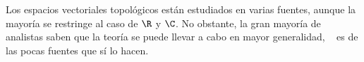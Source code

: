 \documentclass[topologia-analisis.tex]{subfiles}
\begin{document}
Los espacios vectoriales topológicos están estudiados en varias fuentes, aunque la mayoría se restringe al caso de $\R$ y $\C$.
No obstante, la gran mayoría de analistas saben que la teoría se puede llevar a cabo en mayor generalidad,
\citeauthor{bourbaki:evt}~\cite{bourbaki:evt} es de las pocas fuentes que sí lo hacen.

\printbibliography[segment=\therefsegment, check=onlynew, notcategory=history, notcategory=historical, notcategory=other]
\end{document}
